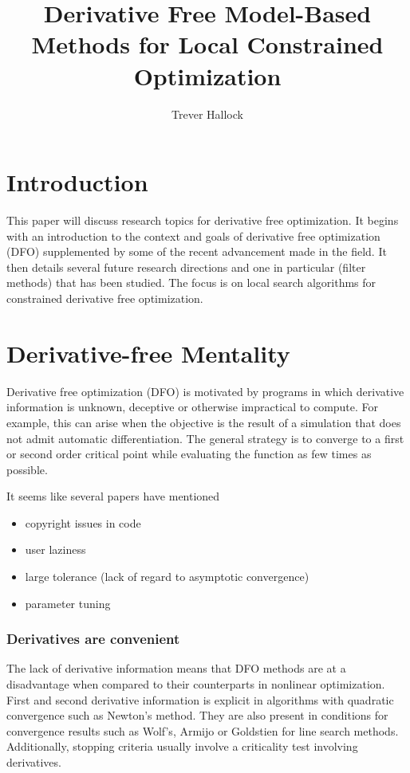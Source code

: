 \documentclass{article}
\title{Derivative Free Model-Based Methods for Local Constrained Optimization}
\author{Trever Hallock}
\begin{document}
%
\algnewcommand{\Goto}{\algorithmicgoto\xspace}%
\algnewcommand{\Label}{\State\unskip}


\maketitle


\tableofcontents

\section{Introduction}

This paper will discuss research topics for derivative free optimization.
It begins with an introduction to the context and goals of derivative free optimization (DFO) supplemented by some of the recent advancement made in the field.
It then details several future research directions and one in particular (filter methods) that has been studied.
The focus is on local search algorithms for constrained derivative free optimization.


\section{Derivative-free Mentality}

Derivative free optimization (DFO) is motivated by programs in which derivative information is unknown, deceptive or otherwise impractical to compute.
For example, this can arise when the objective is the result of a simulation that does not admit automatic differentiation.
The general strategy is to converge to a first or second order critical point while evaluating the function as few times as possible.

It seems like several papers have mentioned
\begin{itemize}
\item copyright issues in code
\item user laziness
\item large tolerance (lack of regard to asymptotic convergence)
\item parameter tuning
\end{itemize}

\subsubsection{Derivatives are convenient}

The lack of derivative information means that DFO methods are at a disadvantage when compared to their counterparts in nonlinear optimization.
First and second derivative information is explicit in algorithms with quadratic convergence such as Newton's method.
They are also present in conditions for convergence results such as Wolf's, Armijo or Goldstien for line search methods.
Additionally, stopping criteria usually involve a criticality test involving derivatives.
\end{document}

